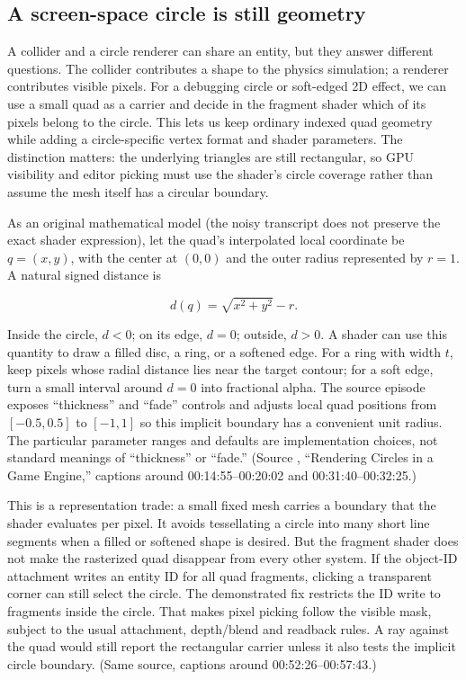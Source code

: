 \hypertarget{06-engine-ii-ch040-grow-behaviour-and-presentation-without-losing-ownership}{}

\subsection{A screen-space circle is still geometry}\label{06-engine-ii-ch040-a-screen-space-circle-is-still-geometry}

\hypertarget{06-engine-ii-ch040-a-screen-space-circle-is-still-geometry}{}

A collider and a circle renderer can share an entity, but they answer different questions. The collider contributes a shape to the physics simulation; a renderer contributes visible pixels. For a debugging circle or soft-edged 2D effect, we can use a small quad as a carrier and decide in the fragment shader which of its pixels belong to the circle. This lets us keep ordinary indexed quad geometry while adding a circle-specific vertex format and shader parameters. The distinction matters: the underlying triangles are still rectangular, so GPU visibility and editor picking must use the shader's circle coverage rather than assume the mesh itself has a circular boundary.

As an original mathematical model (the noisy transcript does not preserve the exact shader expression), let the quad's interpolated local coordinate be \(q=(x,y)\), with the center at \((0,0)\) and the outer radius represented by \(r=1\). A natural signed distance is

\[
d(q)=\sqrt{x^2+y^2}-r.
\]

Inside the circle, \(d<0\); on its edge, \(d=0\); outside, \(d>0\). A shader can use this quantity to draw a filled disc, a ring, or a softened edge. For a ring with width \(t\), keep pixels whose radial distance lies near the target contour; for a soft edge, turn a small interval around \(d=0\) into fractional alpha. The source episode exposes ``thickness'' and ``fade'' controls and adjusts local quad positions from \([-0.5,0.5]\) to \([-1,1]\) so this implicit boundary has a convenient unit radius. The particular parameter ranges and defaults are implementation choices, not standard meanings of ``thickness'' or ``fade.'' (Source , ``Rendering Circles in a Game Engine,'' captions around 00:14:55--00:20:02 and 00:31:40--00:32:25.)

This is a representation trade: a small fixed mesh carries a boundary that the shader evaluates per pixel. It avoids tessellating a circle into many short line segments when a filled or softened shape is desired. But the fragment shader does not make the rasterized quad disappear from every other system. If the object-ID attachment writes an entity ID for all quad fragments, clicking a transparent corner can still select the circle. The demonstrated fix restricts the ID write to fragments inside the circle. That makes pixel picking follow the visible mask, subject to the usual attachment, depth/blend and readback rules. A ray against the quad would still report the rectangular carrier unless it also tests the implicit circle boundary. (Same source, captions around 00:52:26--00:57:43.)

